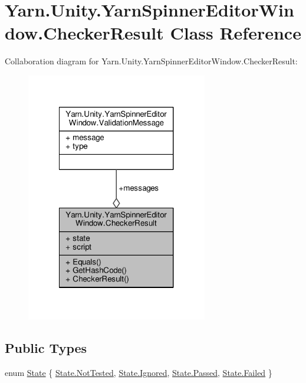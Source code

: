 \hypertarget{a00024}{\section{Yarn.\-Unity.\-Yarn\-Spinner\-Editor\-Window.\-Checker\-Result Class Reference}
\label{a00024}
}


Collaboration diagram for Yarn.\-Unity.\-Yarn\-Spinner\-Editor\-Window.\-Checker\-Result\-:
\nopagebreak
\begin{figure}[H]
\begin{center}
\leavevmode
\includegraphics[width=224pt]{d2/d45/a00342}
\end{center}
\end{figure}
\subsection*{Public Types}
\begin{DoxyCompactItemize}
\item 
enum \hyperlink{a00024_ab24848d7951ce44eb3c7768c6ee10385}{State} \{ \hyperlink{a00024_ab24848d7951ce44eb3c7768c6ee10385a0197c47523ba5a2bdfef705786687de5}{State.\-Not\-Tested}, 
\hyperlink{a00024_ab24848d7951ce44eb3c7768c6ee10385ad96143ba1b15645919cea00ec9d1be62}{State.\-Ignored}, 
\hyperlink{a00024_ab24848d7951ce44eb3c7768c6ee10385aa0d0628f6b4e4d78d2ffef4d4d1c4b15}{State.\-Passed}, 
\hyperlink{a00024_ab24848d7951ce44eb3c7768c6ee10385ad7c8c85bf79bbe1b7188497c32c3b0ca}{State.\-Failed}
 \}
\end{DoxyCompactItemize}
